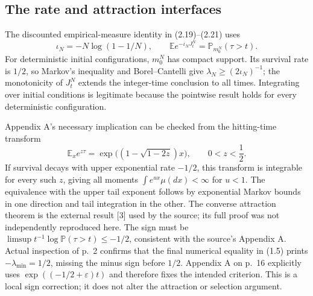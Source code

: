 \documentclass[10pt]{article}
\begin{document}
\subsection*{The rate and attraction interfaces}
The discounted empirical-measure identity in (2.19)–(2.21) uses \[\iota_N=-N\log(1-1/N),\qquad
 \mathbb E e^{-\iota_NJ_t^N}=\mathbb P_{m_0^N}(\tau>t).\] For deterministic initial configurations, \(m_0^N\) has compact support. Its survival rate is \(1/2\), so Markov’s inequality and Borel–Cantelli give \(\lambda_N\geq(2\iota_N)^{-1}\); the monotonicity of \(J_t^N\) extends the integer-time conclusion to all times. Integrating over initial conditions is legitimate because the pointwise result holds for every deterministic configuration.\par
Appendix A’s necessary implication can be checked from the hitting-time transform \[\mathbb E_xe^{z\tau}
 =\exp\!\bigl((1-\sqrt{1-2z})x\bigr),\qquad 0<z<\frac12.\] If survival decays with upper exponential rate \(-1/2\), this transform is integrable for every such \(z\), giving all moments \(\int e^{ux}\mu(dx)<\infty\) for \(u<1\). The equivalence with the upper tail exponent follows by exponential Markov bounds in one direction and tail integration in the other. The converse attraction theorem is the external result [3] used by the source; its full proof was not independently reproduced here. The sign must be \(\limsup t^{-1}\log\mathbb P(\tau>t)\leq-1/2\), consistent with the source’s Appendix A. Actual inspection of p. 2 confirms that the final numerical equality in (1.5) prints \(-\lambda_{\min}=1/2\), missing the minus sign before \(1/2\). Appendix A on p. 16 explicitly uses \(\exp((-1/2+\varepsilon)t)\) and therefore fixes the intended criterion. This is a local sign correction; it does not alter the attraction or selection argument.\par
\end{document}
